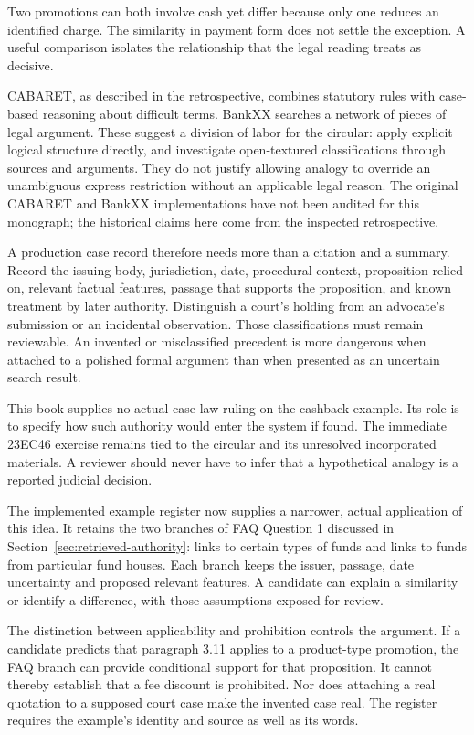 \documentclass[12pt,a4paper,oneside,openany]{book}
\begin{document}
Two promotions can both involve cash yet differ because only one reduces an identified charge. The similarity in payment form does not settle the exception. A useful comparison isolates the relationship that the legal reading treats as decisive.


CABARET, as described in the retrospective, combines statutory rules with
case-based reasoning about difficult terms. BankXX searches a network of pieces
of legal argument. These suggest a division of labor for the circular: apply
explicit logical structure directly, and investigate open-textured classifications
through sources and arguments. They do not justify allowing analogy to override
an unambiguous express restriction without an applicable legal reason. The
original CABARET and BankXX implementations have not been audited for this
monograph; the historical claims here come from the inspected retrospective.

A production case record therefore needs more than a citation and a summary.
Record the issuing body, jurisdiction, date, procedural context, proposition
relied on, relevant factual features, passage that supports the proposition, and
known treatment by later authority. Distinguish a court's holding from an
advocate's submission or an incidental observation. Those classifications must
remain reviewable. An invented or misclassified precedent is more dangerous when
attached to a polished formal argument than when presented as an uncertain search
result.

This book supplies no actual case-law ruling on the cashback example. Its role is
to specify how such authority would enter the system if found. The immediate
23EC46 exercise remains tied to the circular and its unresolved incorporated
materials. A reviewer should never have to infer that a hypothetical analogy is
a reported judicial decision.

The implemented example register now supplies a narrower, actual application of
this idea. It retains the two branches of FAQ Question 1 discussed in
Section~\ref{sec:retrieved-authority}: links to certain types of funds and links
to funds from particular fund houses. Each branch keeps the issuer, passage,
date uncertainty and proposed relevant features. A candidate can explain a
similarity or identify a difference, with those assumptions exposed for review.

The distinction between applicability and prohibition controls the argument.
If a candidate predicts that paragraph 3.11 applies to a product-type promotion,
the FAQ branch can provide conditional support for that proposition. It cannot
thereby establish that a fee discount is prohibited. Nor does attaching a real
quotation to a supposed court case make the invented case real. The register
requires the example's identity and source as well as its words.
\end{document}

